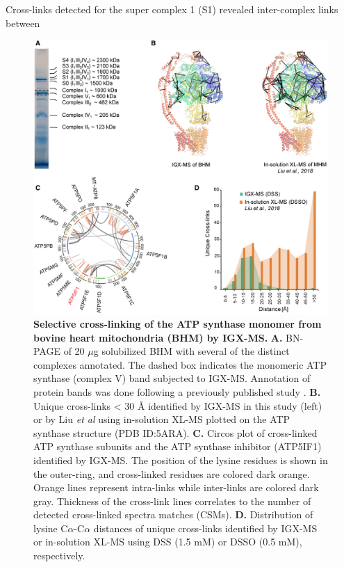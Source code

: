 Cross-links detected for the super complex 1 (S1) revealed inter-complex links between\\

\begin{figure}[hbt!]
\center
\includegraphics[width=\textwidth]{Chapter.2/Figures/Fig4.jpg} 
\caption{\textbf{Selective cross-linking of the ATP synthase monomer from bovine heart mitochondria (BHM) by IGX-MS.} \textbf{A.} BN-PAGE of 20 $\mu$g solubilized BHM with several of the distinct complexes annotated. The dashed box indicates the monomeric ATP synthase (complex V) band subjected to IGX-MS. Annotation of protein bands was done following a previously published study \cite{Wittig_2010}. \textbf{B.} Unique cross-links < 30 Å identified by IGX-MS in this study (left) or by Liu \emph{et al} \cite{Liu_2018} using in-solution XL-MS plotted on the ATP synthase structure (PDB ID:5ARA). \textbf{C.} Circos plot of cross-linked ATP synthase subunits and the ATP synthase inhibitor (ATP5IF1) identified by IGX-MS. The position of the lysine residues is shown in the outer-ring, and cross-linked residues are colored dark orange. Orange lines represent intra-links while inter-links are colored dark gray. Thickness of the cross-link lines correlates to the number of detected cross-linked spectra matches (CSMs). \textbf{D.} Distribution of lysine C$\alpha$-C$\alpha$ distances of unique cross-links identified by IGX-MS or in-solution XL-MS \cite{Liu_2018} using DSS (1.5 mM) or DSSO (0.5 mM), respectively.}
\label{fig:ch2_fig4}
\end{figure}
\clearpage


